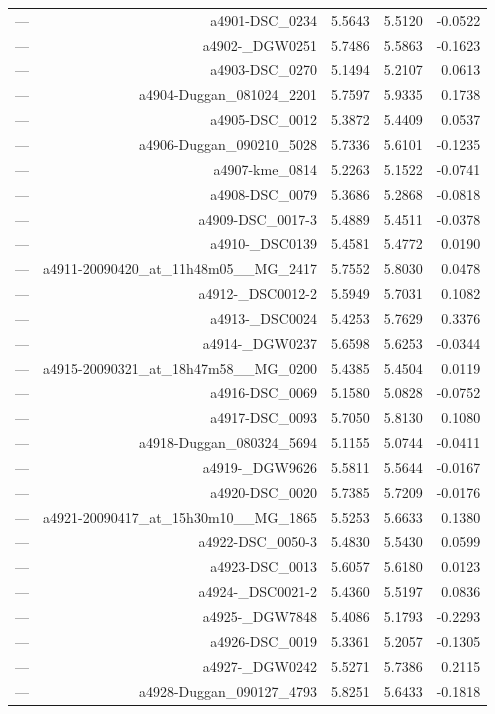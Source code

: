 \begin{table}[htbp]
\begin{tabular}{lrrrr}
— & a4901-DSC_0234 & 5.5643 & 5.5120 & -0.0522 \\
— & a4902-_DGW0251 & 5.7486 & 5.5863 & -0.1623 \\
— & a4903-DSC_0270 & 5.1494 & 5.2107 & 0.0613 \\
— & a4904-Duggan_081024_2201 & 5.7597 & 5.9335 & 0.1738 \\
— & a4905-DSC_0012 & 5.3872 & 5.4409 & 0.0537 \\
— & a4906-Duggan_090210_5028 & 5.7336 & 5.6101 & -0.1235 \\
— & a4907-kme_0814 & 5.2263 & 5.1522 & -0.0741 \\
— & a4908-DSC_0079 & 5.3686 & 5.2868 & -0.0818 \\
— & a4909-DSC_0017-3 & 5.4889 & 5.4511 & -0.0378 \\
— & a4910-_DSC0139 & 5.4581 & 5.4772 & 0.0190 \\
— & a4911-20090420_at_11h48m05__MG_2417 & 5.7552 & 5.8030 & 0.0478 \\
— & a4912-_DSC0012-2 & 5.5949 & 5.7031 & 0.1082 \\
— & a4913-_DSC0024 & 5.4253 & 5.7629 & 0.3376 \\
— & a4914-_DGW0237 & 5.6598 & 5.6253 & -0.0344 \\
— & a4915-20090321_at_18h47m58__MG_0200 & 5.4385 & 5.4504 & 0.0119 \\
— & a4916-DSC_0069 & 5.1580 & 5.0828 & -0.0752 \\
— & a4917-DSC_0093 & 5.7050 & 5.8130 & 0.1080 \\
— & a4918-Duggan_080324_5694 & 5.1155 & 5.0744 & -0.0411 \\
— & a4919-_DGW9626 & 5.5811 & 5.5644 & -0.0167 \\
— & a4920-DSC_0020 & 5.7385 & 5.7209 & -0.0176 \\
— & a4921-20090417_at_15h30m10__MG_1865 & 5.5253 & 5.6633 & 0.1380 \\
— & a4922-DSC_0050-3 & 5.4830 & 5.5430 & 0.0599 \\
— & a4923-DSC_0013 & 5.6057 & 5.6180 & 0.0123 \\
— & a4924-_DSC0021-2 & 5.4360 & 5.5197 & 0.0836 \\
— & a4925-_DGW7848 & 5.4086 & 5.1793 & -0.2293 \\
— & a4926-DSC_0019 & 5.3361 & 5.2057 & -0.1305 \\
— & a4927-_DGW0242 & 5.5271 & 5.7386 & 0.2115 \\
— & a4928-Duggan_090127_4793 & 5.8251 & 5.6433 & -0.1818 \\

\end{tabular}
\end{table}

